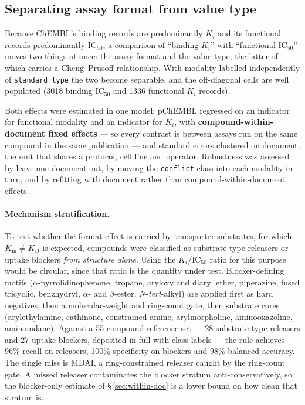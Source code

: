 \documentclass[11pt,a4paper]{article}
\begin{document}
\subsection{Separating assay format from value type}
\label{sec:twobytwo}
Because ChEMBL's binding records are predominantly $K_i$ and its functional records
predominantly IC$_{50}$, a comparison of ``binding $K_i$'' with ``functional
IC$_{50}$'' moves two things at once: the assay format and the value type, the latter
of which carries a Cheng--Prusoff relationship.\cite{Kalliokoski2013} With modality
labelled independently of \texttt{standard\_type} the two become separable, and the
off-diagonal cells are well populated (3018 binding IC$_{50}$ and 1336 functional
$K_i$ records).

Both effects were estimated in one model: pChEMBL regressed on an indicator for
functional modality and an indicator for $K_i$, with \textbf{compound-within-document
fixed effects} --- so every contrast is between assays run on the same compound in the
same publication --- and standard errors clustered on document, the unit that shares a
protocol, cell line and operator. Robustness was assessed by leave-one-document-out,
by moving the \texttt{conflict} class into each modality in turn, and by refitting with
document rather than compound-within-document effects.

\paragraph{Mechanism stratification.} To test whether the format effect is carried by
transporter substrates, for which $K_\mathrm{m}\neq K_\mathrm{D}$ is
expected,\cite{Schomig1988,Eshleman1999} compounds were classified as substrate-type
releasers or uptake blockers \emph{from structure alone}. Using the $K_i$/IC$_{50}$
ratio for this purpose would be circular, since that ratio is the quantity under test.
Blocker-defining motifs ($\alpha$-pyrrolidinophenone, tropane, aryloxy and diaryl
ether, piperazine, fused tricyclic, benzhydryl, $\alpha$- and $\beta$-ester,
$N$-\textit{tert}-alkyl) are applied first as hard negatives, then a molecular-weight
and ring-count gate, then substrate cores (arylethylamine, cathinone, constrained
amine, arylmorpholine, aminooxazoline, aminoindane). Against a 55-compound reference
set --- 28 substrate-type releasers and 27 uptake blockers, deposited in full with class
labels --- the rule achieves 96\% recall on releasers, 100\% specificity on blockers and
98\% balanced accuracy. The single miss is MDAI, a ring-constrained releaser caught by the
ring-count gate. A missed releaser contaminates the blocker stratum anti-conservatively,
so the blocker-only estimate of \S\,\ref{sec:within-doc} is a lower bound on how clean
that stratum is.
\end{document}
